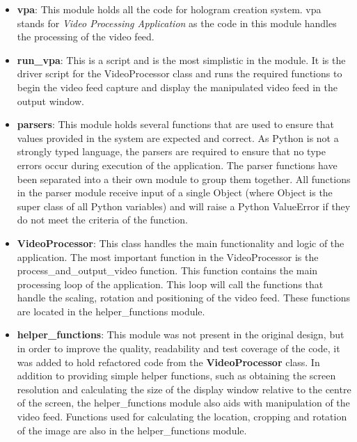 \begin{itemize}
	\item \textbf{vpa}: This module holds all the code for hologram creation system. vpa stands for \textit{Video Processing Application} as the code in this module handles the processing of the video feed.

	\item \textbf{run\_vpa}: This is a script and is the most simplistic in the module. It is the driver script for the VideoProcessor class and runs the required functions to begin the video feed capture and display the manipulated video feed in the output window.

	\item \textbf{parsers}: This module holds several functions that are used to ensure that values provided in the system are expected and correct. As Python is not a strongly typed language, the parsers are required to ensure that no type errors occur during execution of the application. The parser functions have been separated into a their own module to group them together. All functions in the parser module receive input of a single Object (where Object is the super class of all Python variables) and will raise a Python ValueError if they do not meet the criteria of the function.

	\item \textbf{VideoProcessor}: This class handles the main functionality and logic of the application. The most important function in the VideoProcessor is the process\_and\_output\_video function. This function contains the main processing loop of the application. This loop will call the functions that handle the scaling, rotation and positioning of the video feed. These functions are located in the helper\_functions module.  

	\item \textbf{helper\_functions}: This module was not present in the original design, but in order to improve the quality, readability and test coverage of the code, it was added to hold refactored code from the \textbf{VideoProcessor} class. In addition to providing simple helper functions, such as obtaining the screen resolution and calculating the size of the display window relative to the centre of the screen, the helper\_functions module also aids with manipulation of the video feed. Functions used for calculating the location, cropping and rotation of the image are also in the helper\_functions module.

\end{itemize}

